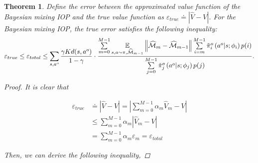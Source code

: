 \documentclass{article}
\newtheorem{theorem}{Theorem}
\begin{document}

\begin{theorem}
Define the error between the approximated value function of the Bayesian mixing IOP and the true value function as $\varepsilon_{true}\doteq \left|\widehat{V}-V\right|$. For the Bayesian mixing IOP, the true error satisfies the following inequality:
\begin{equation*}\small
\varepsilon_{true} \leq \varepsilon_{total} \leq \sum\limits_{s,a^o}\frac{\gamma K d(s,a^o)}{1-\gamma} 
  \cdot \frac{\sum\limits_{m=0}^{M-1}\underset{s,a\sim\pi,\widehat{\mathcal{M}}_{m-1}}{\mathbb{E}}\left\|\widehat{\mathcal{M}}_m-\widehat{\mathcal{M}}_{m-1}\right\|\sum\limits_{i=m}^{M-1}\tilde{\pi}^o_i\left(a^{o} | s ; \phi_{i}\right) p(i)}{\sum\limits_{j=0}^{M-1}\tilde{\pi}^o_j\left(a^{o} | s ; \phi_{j}\right) p(j)}.
\end{equation*}
\begin{proof}

It is clear that

\begin{align*}
    \varepsilon_{true} & \doteq\left|\widehat{V}-V\right|=\left|\sum_{m=0}^{M-1}\alpha_m\widehat{V}_m-V\right|\\
    &\leq\sum_{m=0}^{M-1}\alpha_m\left|\widehat{V}_m - V\right|\\
    &=\sum_{m=0}^{M-1}\alpha_m\varepsilon_m=\varepsilon_{total}
\end{align*}

Then, we can derive the following inequality,


\end{proof}
\end{theorem}
\end{document}
